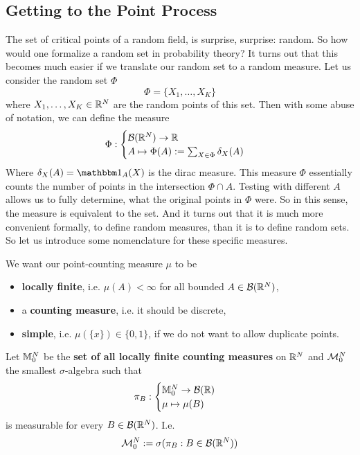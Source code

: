 \subsection{Getting to the Point Process}

The set of critical points of a random field, is surprise, surprise: random.
So how would one formalize a random set in probability theory? It turns
out that this becomes much easier if we translate our random set to a random
measure. Let us consider the random set \(\Phi\)
\[
	\Phi = \{ X_1, \dots, X_K\}
\]
where \(X_1,\dots, X_K\in\mathbb{R}^N\) are the random points of this set. Then with some
abuse of notation, we can define the measure
\[
	\Phi :
	\begin{cases}
		\mathcal{B}(\mathbb{R}^N) \to \mathbb{R} \\
		A \mapsto \Phi(A):= \sum_{X\in \Phi}\delta_X(A) 
	\end{cases}
\]
Where \(\delta_X(A)=\ind_A(X)\) is the dirac measure. This measure \(\Phi\)
essentially counts the number of points in the intersection \(\Phi\cap A\).
Testing with different \(A\) allows us to fully determine, what
the original points in \(\Phi\) were. So in this sense, the measure is
equivalent to the set. And it turns out that it is much more convenient
formally, to define random measures, than it is to define random sets.
So let us introduce some nomenclature for these specific measures.

We want our point-counting measure \(\mu\) to be
\begin{itemize}
	\item \textbf{locally finite}, i.e. \(\mu(A) < \infty\) for all bounded
	\(A\in\mathcal{B}(\mathbb{R}^N)\),
	\item a \textbf{counting measure}, i.e. it should be discrete,
	\item \textbf{simple}, i.e. \(\mu(\{x\})\in\{0,1\}\), if we do not want
	to allow duplicate points.
\end{itemize}
Let \(\mathbb{M}^{N}_0\) be the \textbf{set of all locally finite counting measures}
on \(\mathbb{R}^N\) and \(\mathcal{M}^{N}_0\) the smallest \(\sigma\)-algebra
such that
\[
	\pi_B : \begin{cases}
		\mathbb{M}^{N}_0 \to \mathcal{B}(\mathbb{R})\\
		\mu \mapsto \mu(B)
	\end{cases}
\]
is measurable for every \(B\in\mathcal{B}(\mathbb{R}^N)\). I.e.
\[
	\mathcal{M}^{N}_0 := \sigma(\pi_B : B\in\mathcal{B}(\mathbb{R}^N))
\]

